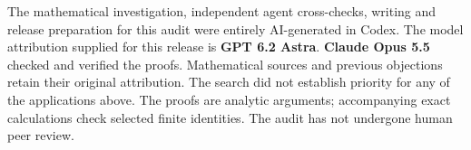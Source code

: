 \documentclass[11pt]{article}
\begin{document}
The mathematical investigation, independent agent cross-checks, writing and release preparation for this audit were entirely AI-generated in Codex. The model attribution supplied for this release is \textbf{GPT 6.2 Astra}. \textbf{Claude Opus 5.5} checked and verified the proofs. Mathematical sources and previous objections retain their original attribution. The search did not establish priority for any of the applications above. The proofs are analytic arguments; accompanying exact calculations check selected finite identities. The audit has not undergone human peer review.
\end{document}
